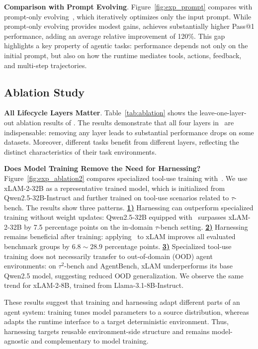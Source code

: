 \noindent \textbf{Comparison with Prompt Evolving}. 
Figure~\ref{fig:exp_prompt} compares \method{} with prompt-only evolving~\cite{agrawal2025gepa_Gepa-Reflective-prompt-evolution-can-outperform-reinforcement-learning,ORPO_yang2024large_Large-language-models-as-optimizers}, which iteratively optimizes only the input prompt. While prompt-only evolving provides modest gains, \method{} achieves substantially higher Pass@1 performance, adding an average relative improvement of 120\%. This gap highlights a key property of agentic tasks: performance depends not only on the initial prompt, but also on how the runtime mediates tools, actions, feedback, and multi-step trajectories.

\subsection{Ablation Study}
\noindent \textbf{All Lifecycle Layers Matter}. Table~\ref{tab:ablation} shows the leave-one-layer-out ablation results of \method. The results demonstrate that all four layers in \method~are indispensable: removing any layer leads to substantial performance drops on some datasets. Moreover, different tasks benefit from different layers, reflecting the distinct characteristics of their task environments.

\noindent \textbf{Does Model Training Remove the Need for Harnessing?}
Figure~\ref{fig:exp_ablation2} compares specialized tool-use training with~\method{}. 
We use xLAM-2-32B as a representative trained model, which is initialized from Qwen2.5-32B-Instruct and further trained on tool-use scenarios related to \(\tau\)-bench. 
The results show three patterns. 
\textbf{\underline{1)}} Harnessing can outperform specialized training without weight updates: Qwen2.5-32B equipped with~\method{} surpasses xLAM-2-32B by 7.5 percentage points on the in-domain \(\tau\)-bench setting. 
\textbf{\underline{2)}} Harnessing remains beneficial after training: applying~\method{} to xLAM improves all evaluated benchmark groups by $6.8\sim 28.9$ percentage points. 
\textbf{\underline{3)}} Specialized tool-use training does not necessarily transfer to out-of-domain (OOD) agent environments: on \(\tau^2\)-bench and AgentBench, xLAM underperforms its base Qwen2.5 model, suggesting reduced OOD generalization. 
We observe the same trend for xLAM-2-8B, trained from Llama-3.1-8B-Instruct.

These results suggest that training and harnessing adapt different parts of an agent system: training tunes model parameters to a source distribution, whereas~\method{} adapts the runtime interface to a target deterministic environment. 
Thus, harnessing targets reusable environment-side structure and remains model-agnostic and complementary to model training.
